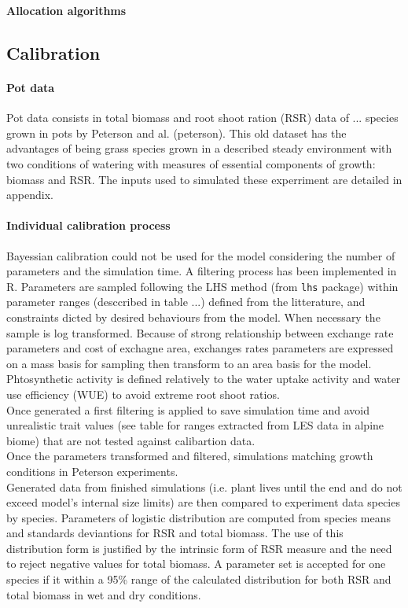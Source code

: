 \documentclass[review]{elsarticle}
\begin{document}
\textbf{Allocation algorithms}


\subsection{Calibration}
\paragraph{Pot data}
Pot data consists in total biomass and root shoot ration (RSR) data of ... species grown in pots by Peterson and al. (peterson). This old dataset has the advantages of being grass species grown in a described steady environment with two conditions of watering with measures of essential components of growth: biomass and RSR. The inputs used to simulated these experriment are detailed in appendix.

\paragraph{Individual calibration process}
Bayessian calibration could not be used for the model considering the number of parameters and the simulation time. A filtering process has been implemented in R. Parameters are sampled following the LHS method (from \texttt{lhs} package)	within parameter ranges (desccribed in table ...) defined from the litterature, and constraints dicted by desired behaviours from the model. When necessary the sample is log transformed. Because of strong relationship between exchange rate parameters and cost of exchagne area, exchanges rates parameters are expressed on a mass basis for sampling then transform to an area basis for the model. Phtosynthetic activity is defined relatively to the water uptake activity and water use efficiency (WUE) to avoid extreme root shoot ratios.\\

Once generated a first filtering is applied to save simulation time and avoid unrealistic trait values (see table for ranges extracted from LES data in alpine biome) that are not tested against calibartion data.\\
Once the parameters transformed and filtered, simulations matching growth conditions in Peterson experiments.\\
Generated data from finished simulations (i.e. plant lives until the end and do not exceed model's internal size limits) are then compared to experiment data species by species. Parameters of logistic distribution are computed from species means and standards deviantions for RSR and total biomass. The use of this distribution form is justified by the intrinsic form of RSR measure and the need to reject negative values for total biomass. A parameter set is accepted for one species if it within a 95\% range of the calculated distribution for both RSR and total biomass in wet and dry conditions.\\
\end{document}
